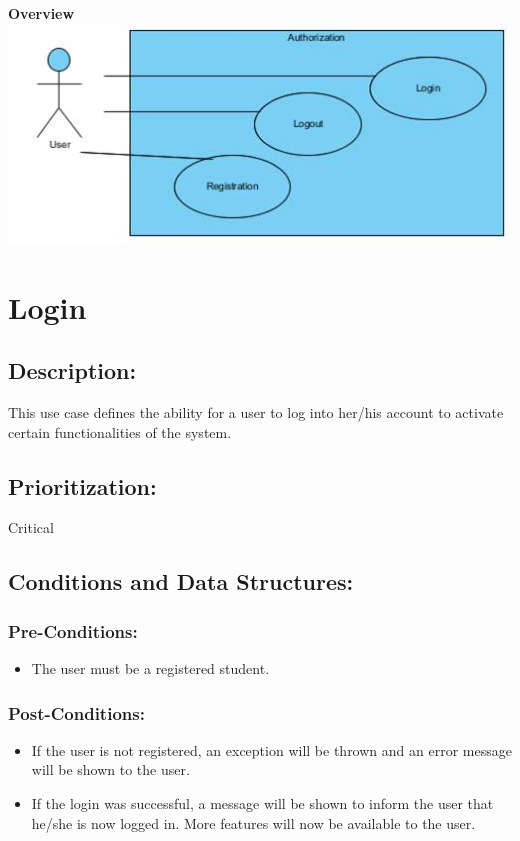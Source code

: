 \documentclass[a4paper,11pt]{article}
\begin{document}
\textbf{Overview}\\
\includegraphics[width=1\linewidth]{./Images/OverviewDiagrams/AuthorizationOverview.jpg}\\
\section{Login}
\subsection*{Description:}This use case defines the ability for a user to log into her/his account to activate certain functionalities of the system.
\subsection{Prioritization:}Critical
\subsection{Conditions and Data Structures:}
\subsubsection*{Pre-Conditions:}
\begin{itemize}
	\item The user must be a registered student.
\end{itemize}
\subsubsection*{Post-Conditions:}
\begin{itemize}
	\item If the user is not registered, an exception will be thrown and an error message will be shown to the user.
	\item If the login was successful, a message will be shown to inform the user that he/she is now logged in. More features will now be available to the user.
\end{itemize}
\end{document}
